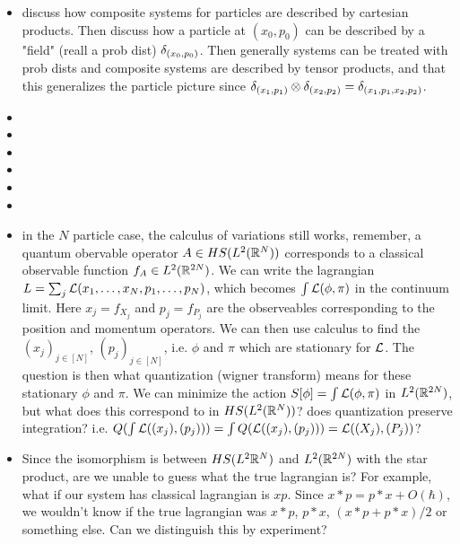 \documentclass{book}
\begin{document}
	\begin{itemize}
		\item discuss how composite systems for particles are described by cartesian products. Then discuss how a particle at $(x_0,p_0)$ can be described by a "field" (reall a prob dist) $\delta_{(x_0, p_0)}$. Then generally systems can be treated with prob dists and composite systems are described by tensor products, and that this generalizes the particle picture since $\delta_{(x_1, p_1)} \otimes \delta_{(x_2, p_2)} = \delta_{(x_1, p_1, x_2, p_2)}$. 
		\item {}
		\item {}
		\item {}
		\item {}
		\item {}
		\item {}
		\item in the $N$ particle case, the calculus of variations still works, remember, a quantum obervable operator $A \in HS(L^2(\mathbb{R}^N))$ corresponds to a classical observable function $f_A \in L^2(\mathbb{R}^{2N})$. We can write the lagrangian $L = \sum_{j} \mathcal{L}(x_1, \ldots, x_N, p_1, \ldots, p_N)$, which becomes $\int \mathcal{L}(\phi, \pi)$ in the continuum limit. Here $x_j = f_{X_j}$ and $p_j = f_{P_j}$ are the observeables corresponding to the position and momentum operators. We can then use calculus to find the $(x_j)_{j \in [N]}$, $(p_j)_{j \in [N]}$, i.e. $\phi$ and $\pi$ which are stationary for $\mathcal{L}$.    
		The question is then what quantization (wigner transform) means for these stationary $\phi$ and $\pi$. We can minimize the action $S[\phi] = \int \mathcal{L}(\phi, \pi)$ in $L^2(\mathbb{R}^{2N})$, but what does this correspond to in $HS(L^2(\mathbb{R}^N))$? does quantization preserve integration? i.e. $Q(\int \mathcal{L}((x_j), (p_j))) = \int Q(\mathcal{L}((x_j), (p_j))) = \mathcal{L}((X_j), (P_j))$? 
		\item Since the isomorphism is between $HS(L^2\mathbb{R}^N)$ and $L^2(\mathbb{R}^{2N})$ with the star product, are we unable to guess what the true lagrangian is? For example, what if our system has classical lagrangian is $xp$. Since $x*p = p*x + O(\hbar)$, we wouldn't know if the true lagrangian was $x*p$, $p*x$, $(x*p + p*x)/2$ or something else. Can we distinguish this by experiment? 

\end{itemize}
\end{document}
